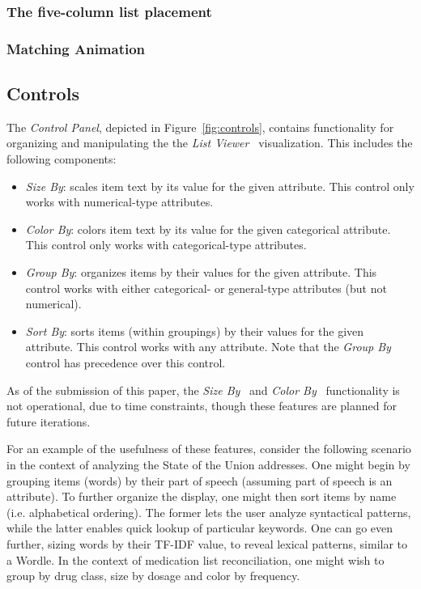 \documentclass{chi2009}
\newcommand{\ListViewer}{\textit{List Viewer}}
\newcommand{\Controls}{\textit{Control Panel}}
\newcommand{\SizeBy}{\textit{Size By}}
\newcommand{\ColorBy}{\textit{Color By}}
\newcommand{\GroupBy}{\textit{Group By}}
\newcommand{\SortBy}{\textit{Sort By}}
\begin{document}
\subsubsection{The five-column list placement}

\subsubsection{Matching Animation}

\subsection{Controls}
The \Controls, depicted in Figure~\ref{fig:controls}, contains functionality for organizing and manipulating the the \ListViewer~ visualization. This includes the following components:
\begin{itemize}
\item \SizeBy: scales item text by its value for the given attribute. This control only works with numerical-type attributes.
\item \ColorBy: colors item text by its value for the given categorical attribute. This control only works with categorical-type attributes.
\item \GroupBy: organizes items by their values for the given attribute. This control works with either categorical- or general-type attributes (but not numerical).
\item \SortBy: sorts items (within groupings) by their values for the given attribute. This control works with any attribute. Note that the \GroupBy~ control has precedence over this control.
\end{itemize}
As of the submission of this paper, the \SizeBy~ and \ColorBy~ functionality is not operational, due to time constraints, though these features are planned for future iterations.

For an example of the usefulness of these features, consider the following scenario in the context of analyzing the State of the Union addresses. One might begin by grouping items (words) by their part of speech (assuming part of speech is an attribute). To further organize the display, one might then sort items by name (i.e. alphabetical ordering). The former lets the user analyze syntactical patterns, while the latter enables quick lookup of particular keywords. One can go even further, sizing words by their TF-IDF value, to reveal lexical patterns, similar to a Wordle\cite{Viegas2009}. In the context of medication list reconciliation, one might wish to group by drug class, size by dosage and color by frequency.
 
\end{document}
